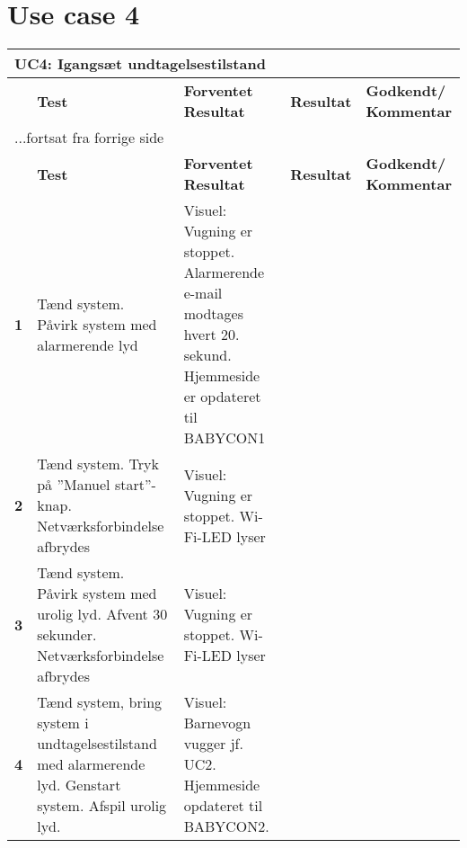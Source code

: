 \section*{Use case 4}

\begin{center}
	\label{accepttest:uc4} 
\begin{longtable}{|p{}|p{}|p{}|p{}|p{}|} %
\hline
\multicolumn{5}{|l|}{\textbf{UC4: Igangsæt undtagelsestilstand}} \\ \hline
\multicolumn{1}{|c|}{} &
\textbf{Test} &
\textbf{Forventet \newline Resultat} &
\textbf{Resultat} &
\textbf{Godkendt/ \newline Kommentar} \\ \hline 
\endfirsthead

\multicolumn{5}{l}{...fortsat fra forrige side} \\ \hline 
\multicolumn{1}{|c|}{} &
\textbf{Test} &
\textbf{Forventet \newline Resultat} &
\textbf{Resultat} &
\textbf{Godkendt/ \newline Kommentar} \\ \hline 
\endhead



\textbf{1}	&Tænd system. Påvirk system med alarmerende lyd
			&Visuel: Vugning er stoppet. Alarmerende e-mail 
			 modtages hvert 20. sekund. Hjemmeside er 
			 opdateret til BABYCON1
			&
			&
			\\\hline
			
\textbf{2}  &Tænd system. Tryk på ''Manuel start''-knap. 
			 Netværksforbindelse afbrydes
			&Visuel: Vugning er stoppet. Wi-Fi-LED lyser
			&
			&
			\\\hline	
			
\textbf{3}  &Tænd system. Påvirk system med urolig lyd. 
			 Afvent 30 sekunder. Netværksforbindelse afbrydes
			&Visuel: Vugning er stoppet. Wi-Fi-LED lyser
			&
			&
			\\\hline	

\textbf{4}	&Tænd system, bring system i undtagelsestilstand
			 med alarmerende lyd. Genstart system. Afspil urolig
			 lyd.
			&Visuel: Barnevogn vugger jf. UC2. Hjemmeside 
			 opdateret til BABYCON2.
			&
			&
			\\\hline
			
\end{longtable}
\end{center}